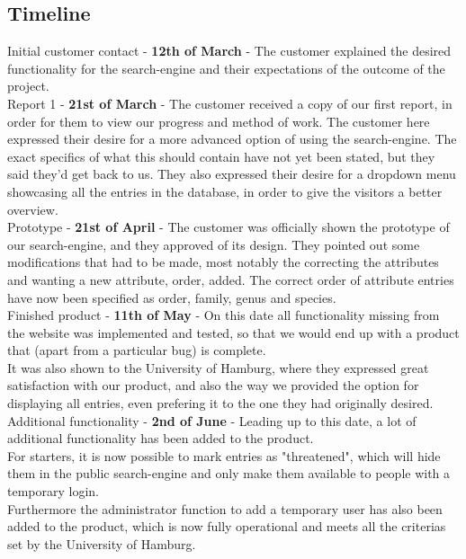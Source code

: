 \documentclass[12pt,a4paper]{article}
\begin{document}
\subsection{Timeline}

	Initial customer contact - {\bf 12th of March} - The customer explained the desired functionality for the search-engine and their expectations of the outcome of the project. \\
	
	
	Report 1 - {\bf 21st of March} - The customer received a copy of our first report, in order for them to view our progress and method of work.
	The customer here expressed their desire for a more advanced option of using the search-engine. The exact specifics of what this should contain have not yet been stated, but they said they'd get back to us.
	They also expressed their desire for a dropdown menu showcasing all the entries in the database, in order to give the visitors a better overview.\\
	
	
	Prototype - {\bf 21st of April} - The customer was officially shown the prototype of our search-engine, and they approved of its design. They pointed out some modifications that had to be made, most notably the correcting the attributes and wanting a new attribute, order, added. The correct order of attribute entries have now been specified as order, family, genus and species.\\
	
	Finished product - {\bf 11th of May} - On this date all functionality missing from the website was implemented and tested, so that we would end up with a product that (apart from a particular bug) is complete.\\
	It was also shown to the University of Hamburg, where they expressed great satisfaction with our product, and also the way we provided the option for displaying all entries, even prefering it to the one they had originally desired.\\
	
	Additional functionality - {\bf 2nd of June} - Leading up to this date, a lot of additional functionality has been added to the product.\\
	For starters, it is now possible to mark entries as "threatened", which will hide them in the public search-engine and only make them available to people with a temporary login.\\
	Furthermore the administrator function to add a temporary user has also been added to the product, which is now fully operational and meets all the criterias set by the University of Hamburg.
	
\end{document}
